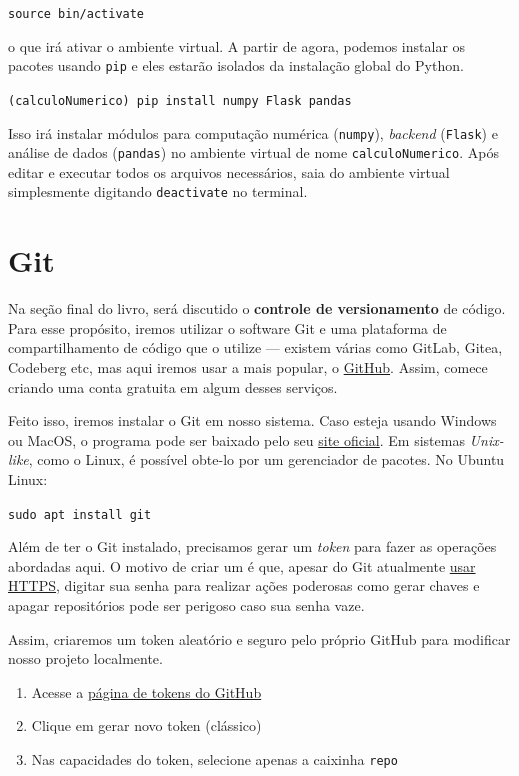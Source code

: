 \documentclass{article}
\begin{document}
	\vspace{1ex}
	\texttt{source bin/activate}
	\vspace{1ex} 

	o que irá ativar o ambiente virtual. A partir de agora, podemos instalar os pacotes usando \texttt{pip} e eles estarão
	isolados da instalação global do Python. 

	\vspace{1ex} 
	\texttt{(calculoNumerico) pip install numpy Flask pandas} 
	\vspace{1ex} 

	Isso irá instalar módulos para computação numérica (\texttt{numpy}), \textit{backend} (\texttt{Flask}) e
	análise de dados (\texttt{pandas}) no ambiente virtual de nome \texttt{calculoNumerico}. Após editar e executar todos
	os arquivos necessários, saia do ambiente virtual simplesmente digitando \texttt{deactivate} no terminal. 

	\section{Git} 

	Na seção final do livro, será discutido o \textbf{controle de versionamento} de código. Para esse propósito, iremos utilizar 
	o software Git e uma plataforma de compartilhamento de código que o utilize --- existem várias como GitLab, Gitea, Codeberg etc, mas
	aqui iremos usar a mais popular, o \href{https://github.com/}{GitHub}. Assim, comece criando uma conta gratuita em algum desses serviços.

	Feito isso, iremos instalar o Git em nosso sistema. Caso esteja usando Windows ou MacOS, o programa pode ser baixado 
	pelo seu \href{https://git-scm.com/}{site oficial}. Em sistemas \textit{Unix-like}, como o Linux, é possível obte-lo por um 
	gerenciador de pacotes. No Ubuntu Linux: 

	\vspace{1ex}
	\texttt{sudo apt install git}
	\vspace{1ex}

	Além de ter o Git instalado, precisamos gerar um \textit{token} para fazer as operações abordadas aqui. 
	O motivo de criar um é que, apesar do Git atualmente \href{https://www.cloudflare.com/pt-br/learning/ssl/what-is-https/}{usar HTTPS}, digitar
	sua senha para realizar ações poderosas como gerar chaves e apagar repositórios pode ser perigoso caso sua senha vaze. 

	Assim, criaremos um token aleatório e seguro pelo próprio GitHub para modificar nosso projeto localmente. 
	\begin{enumerate}
		\item{Acesse a \href{https://github.com/settings/tokens}{página de tokens do GitHub}}
		\item{Clique em gerar novo token (clássico)}
		\item{Nas capacidades do token, selecione apenas a caixinha \texttt{repo}}
	\end{enumerate}
\end{document}
